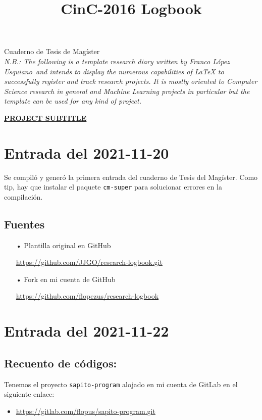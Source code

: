 \documentclass[11pt,letterpaper]{article}
\newcommand{\userName}{Franco López Usquiano}
\begin{document}
\title{CinC-2016 Logbook}
\univlogo
{\Huge Cuaderno de Tesis de Magíster}\\[5mm]

\textit{N.B.: The following is a template research diary written by \userName\ and intends to display the numerous capabilities of LaTeX to successfully register and track research projects. It is mostly oriented to Computer Science research in general and  Machine Learning projects in particular but the template can be used for any kind of project.}

\vspace{1em}
{\large \underline{\textbf{\uppercase{PROJECT SUBTITLE}}}}

\section{Entrada del 2021-11-20}
\label{2021-11-20}

Se compiló y generó la primera entrada del cuaderno de Tesis del Magíster. Como tip, hay que instalar el paquete \verb|cm-super| para solucionar errores en la compilación.

\subsection*{Fuentes}

\begin{itemize}
\item[•] Plantilla original en GitHub

\url{https://github.com/JJGO/research-logbook.git}

\item[•] Fork en mi cuenta de GitHub 

\url{https://github.com/flopezus/research-logbook}

\end{itemize}

\section{Entrada del 2021-11-22}
\label{2021-11-22}

\subsection*{Recuento de códigos:}

Tenemos el proyecto \verb|sapito-program| alojado en mi cuenta de GitLab en el siguiente enlace:

\begin{itemize}
\item \url{https://gitlab.com/flopus/sapito-program.git}
\end{itemize}	
\end{document}
